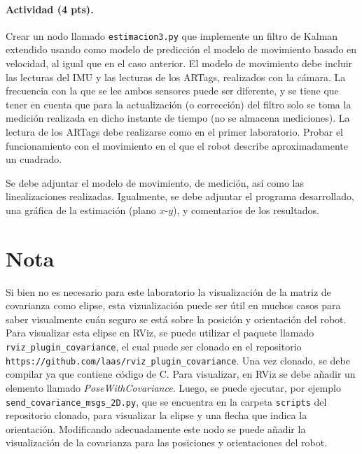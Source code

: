 \documentclass[a4paper,11pt]{robotlabs}
\begin{document}
\paragraph{Actividad (4 pts).} 
Crear un nodo llamado \texttt{estimacion3.py} que implemente un filtro de
Kalman extendido usando como modelo de predicción el modelo de movimiento
basado en velocidad, al igual que en el caso anterior. El modelo de movimiento
debe incluir las lecturas del IMU y las lecturas de los ARTags, realizados con
la cámara. La frecuencia con la que se lee ambos sensores puede ser diferente,
y se tiene que tener en cuenta que para la actualización (o corrección) del
filtro solo se toma la medición realizada en dicho instante de tiempo (no se
almacena mediciones). La lectura de los ARTags debe realizarse como en el
primer laboratorio. Probar el funcionamiento con el movimiento en el que el
robot describe aproximadamente un cuadrado.

Se debe adjuntar el modelo de movimiento, de medición, así como las
linealizaciones realizadas. Igualmente, se debe adjuntar el programa
desarrollado, una gráfica de la estimación (plano $x$-$y$), y comentarios de los
resultados.

  

\section*{Nota}

Si bien no es necesario para este laboratorio la visualización de la matriz de
covarianza como elipse, esta vizualización puede ser útil en muchos casos para
saber visualmente cuán seguro se está sobre la posición y orientación del
robot. Para visualizar esta elipse en RViz, se puede utilizar el paquete
llamado \texttt{rviz\_plugin\_covariance}, el cual puede ser clonado en el
repositorio \texttt{https://github.com/laas/rviz\_plugin\_covariance}. Una vez
clonado, se debe compilar ya que contiene código de C. Para visualizar, en RViz
se debe añadir un elemento llamado \textit{PoseWithCovariance}. Luego, se puede
ejecutar, por ejemplo \texttt{send\_covariance\_msgs\_2D.py}, que se encuentra
en la carpeta \texttt{scripts} del repositorio clonado, para visualizar la
elipse y una flecha que indica la orientación. Modificando adecuadamente este
nodo se puede añadir la visualización de la covarianza para las posiciones y
orientaciones del robot.
\end{document}
